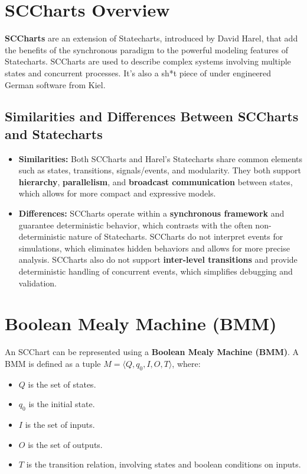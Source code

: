 \documentclass[
  14pt,
  a4paper,
  numbers=noendperiod,
  headinclude=true,
  footinclude=true,
  DIV=calc]{scrreprt}
\begin{document}
\section{SCCharts Overview}\label{sccharts-overview}

\textbf{SCCharts} are an extension of Statecharts, introduced by David
Harel, that add the benefits of the synchronous paradigm to the powerful
modeling features of Statecharts. SCCharts are used to describe complex
systems involving multiple states and concurrent processes. It's also a
sh*t piece of under engineered German software from Kiel.

\subsection{Similarities and Differences Between SCCharts and
Statecharts}\label{similarities-and-differences-between-sccharts-and-statecharts}

\begin{itemize}
\item
  \textbf{Similarities:} Both SCCharts and Harel's Statecharts share
  common elements such as states, transitions, signals/events, and
  modularity. They both support \textbf{hierarchy},
  \textbf{parallelism}, and \textbf{broadcast communication} between
  states, which allows for more compact and expressive models.
\item
  \textbf{Differences:} SCCharts operate within a \textbf{synchronous
  framework} and guarantee deterministic behavior, which contrasts with
  the often non-deterministic nature of Statecharts. SCCharts do not
  interpret events for simulations, which eliminates hidden behaviors
  and allows for more precise analysis. SCCharts also do not support
  \textbf{inter-level transitions} and provide deterministic handling of
  concurrent events, which simplifies debugging and validation.
\end{itemize}

\section{Boolean Mealy Machine (BMM)}\label{boolean-mealy-machine-bmm}

An SCChart can be represented using a \textbf{Boolean Mealy Machine
(BMM)}. A BMM is defined as a tuple
\(M = \langle Q, q_0, I, O, T \rangle\), where:

\begin{itemize}
\item
  \(Q\) is the set of states.
\item
  \(q_0\) is the initial state.
\item
  \(I\) is the set of inputs.
\item
  \(O\) is the set of outputs.
\item
  \(T\) is the transition relation, involving states and boolean
  conditions on inputs.
\end{itemize}
\end{document}
